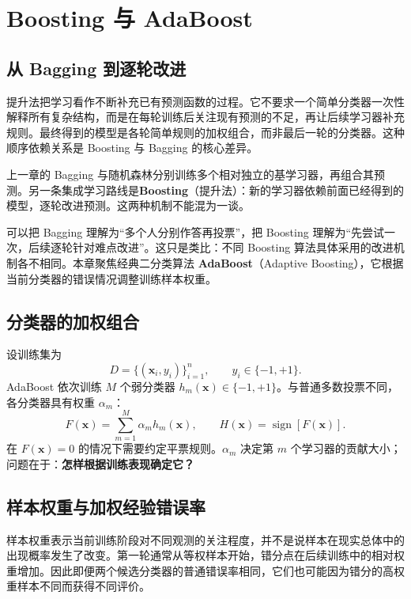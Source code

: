 \section{Boosting 与 AdaBoost}\label{ch:adaboost}

\subsection{从 Bagging 到逐轮改进}

提升法把学习看作不断补充已有预测函数的过程。它不要求一个简单分类器一次性解释所有复杂结构，而是在每轮训练后关注现有预测的不足，再让后续学习器补充规则。最终得到的模型是各轮简单规则的加权组合，而非最后一轮的分类器。这种顺序依赖关系是 Boosting 与 Bagging 的核心差异。

上一章的 Bagging 与随机森林分别训练多个相对独立的基学习器，再组合其预测。另一条集成学习路线是\textbf{Boosting}（提升法）：新的学习器依赖前面已经得到的模型，逐轮改进预测。这两种机制不能混为一谈。

可以把 Bagging 理解为“多个人分别作答再投票”，把 Boosting 理解为“先尝试一次，后续逐轮针对难点改进”。这只是类比：不同 Boosting 算法具体采用的改进机制各不相同。本章聚焦经典二分类算法 \textbf{AdaBoost}（Adaptive Boosting），它根据当前分类器的错误情况调整训练样本权重\cite[第8章]{zhou2016}\cite[第8章]{lihang2019}。

\subsection{分类器的加权组合}

设训练集为
\[
D=\{(\boldsymbol x_i,y_i)\}_{i=1}^{n},\qquad y_i\in\{-1,+1\}.
\]
AdaBoost 依次训练 $M$ 个弱分类器 $h_m(\boldsymbol x)\in\{-1,+1\}$。与普通多数投票不同，各分类器具有权重 $\alpha_m$：
\begin{equation}\label{eq:adaboost-model}
F(\boldsymbol x)=\sum_{m=1}^{M}\alpha_mh_m(\boldsymbol x),\qquad
H(\boldsymbol x)=\operatorname{sign}[F(\boldsymbol x)].
\end{equation}
在 $F(\boldsymbol x)=0$ 的情况下需要约定平票规则。$\alpha_m$ 决定第 $m$ 个学习器的贡献大小；问题在于：\textbf{怎样根据训练表现确定它？}

\subsection{样本权重与加权经验错误率}

样本权重表示当前训练阶段对不同观测的关注程度，并不是说样本在现实总体中的出现概率发生了改变。第一轮通常从等权样本开始，错分点在后续训练中的相对权重增加。因此即便两个候选分类器的普通错误率相同，它们也可能因为错分的高权重样本不同而获得不同评价。

